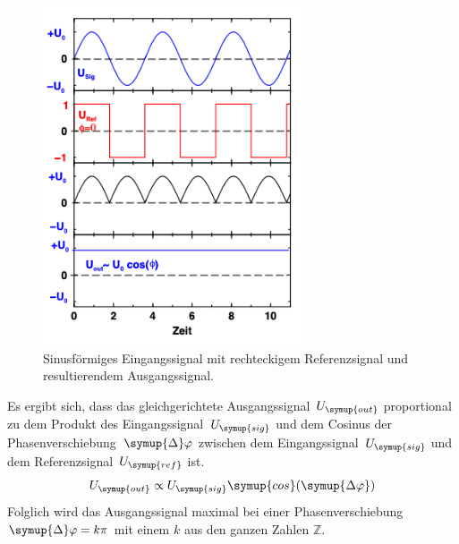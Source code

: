 \begin{figure} [H]
    \centering
    \includegraphics[height=10cm]{content/Bilder/Signalverlaeufe.png}
    \caption{Sinusförmiges Eingangssignal mit rechteckigem Referenzsignal und resultierendem %
    Ausgangssignal.\cite{v303}}
    \label{fig:Signalverlaeufe}
\end{figure}

Es ergibt sich, dass das gleichgerichtete Ausgangssignal~$U_{\symup{out}}$ proportional zu dem Produkt des 
Eingangssignal~$U_{\symup{sig}}$ und dem Cosinus der Phasenverschiebung~$\symup{\Delta}\varphi$ zwischen dem 
Eingangssignal~$U_{\symup{sig}}$ und dem Referenzsignal~$U_{\symup{ref}}$ ist.
\begin{equation}
    U_{\symup{out}} \propto U_{\symup{sig}}\symup{cos}(\symup{\Delta\varphi})
    \label{eq:Ausgangssignal Proportionalitaet}
\end{equation}
Folglich wird das Ausgangssignal maximal bei einer Phasenverschiebung $\symup{\Delta}\varphi = k\pi$ mit einem $k$ aus den ganzen
Zahlen $\mathbb{Z}$.
